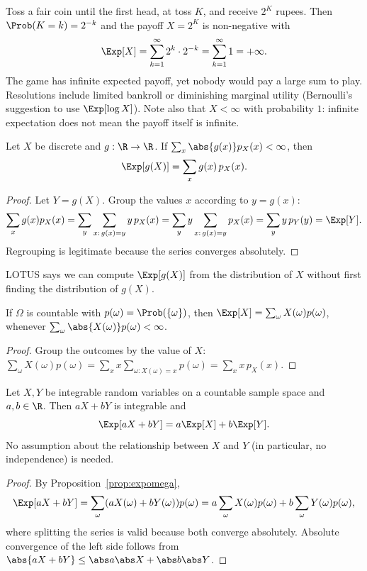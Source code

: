 \begin{example}\label{ex:stpete}
Toss a fair coin until the first head, at toss $K$, and receive $2^K$ rupees.
Then $\Prob(K=k)=2^{-k}$ and the payoff $X=2^K$ is non-negative with
\[
\Exp[X]=\sum_{k=1}^\infty2^k\cdot2^{-k}=\sum_{k=1}^\infty1=+\infty.
\]
The game has infinite expected payoff, yet nobody would pay a large sum to play.
Resolutions include limited bankroll or diminishing marginal utility (Bernoulli's
suggestion to use $\Exp[\log X]$). Note also that $X<\infty$ with probability
$1$: infinite expectation does not mean the payoff itself is infinite.
\end{example}

\begin{theorem}\label{thm:lotus}
Let $X$ be discrete and $g:\R\to\R$. If $\sum_x\abs{g(x)}p_X(x)<\infty$, then
\[
\Exp[g(X)]=\sum_xg(x)\,p_X(x).
\]
\end{theorem}
\begin{proof}
Let $Y=g(X)$. Group the values $x$ according to $y=g(x)$:
\[
\sum_xg(x)p_X(x)=\sum_y\sum_{x:\,g(x)=y}y\,p_X(x)=\sum_yy\sum_{x:\,g(x)=y}p_X(x)
=\sum_yy\,p_Y(y)=\Exp[Y].
\]
Regrouping is legitimate because the series converges absolutely.
\end{proof}

LOTUS says we can compute $\Exp[g(X)]$ from the distribution of $X$ without first
finding the distribution of $g(X)$.

\begin{proposition}\label{prop:expomega}
If $\Omega$ is countable with $p(\omega)=\Prob(\{\omega\})$, then
$\Exp[X]=\sum_{\omega}X(\omega)p(\omega)$, whenever
$\sum_\omega\abs{X(\omega)}p(\omega)<\infty$.
\end{proposition}
\begin{proof}
Group the outcomes by the value of $X$: $\sum_\omega X(\omega)p(\omega)=
\sum_xx\sum_{\omega:X(\omega)=x}p(\omega)=\sum_xx\,p_X(x)$.
\end{proof}

\begin{theorem}\label{thm:linear}
Let $X,Y$ be integrable random variables on a countable sample space and
$a,b\in\R$. Then $aX+bY$ is integrable and
\[
\Exp[aX+bY]=a\Exp[X]+b\Exp[Y].
\]
No assumption about the relationship between $X$ and $Y$ (in particular, no
independence) is needed.
\end{theorem}
\begin{proof}
By Proposition~\ref{prop:expomega},
\[
\Exp[aX+bY]=\sum_\omega(aX(\omega)+bY(\omega))p(\omega)
=a\sum_\omega X(\omega)p(\omega)+b\sum_\omega Y(\omega)p(\omega),
\]
where splitting the series is valid because both converge absolutely. Absolute
convergence of the left side follows from $\abs{aX+bY}\le\abs a\abs X+\abs b\abs Y$.
\end{proof}

